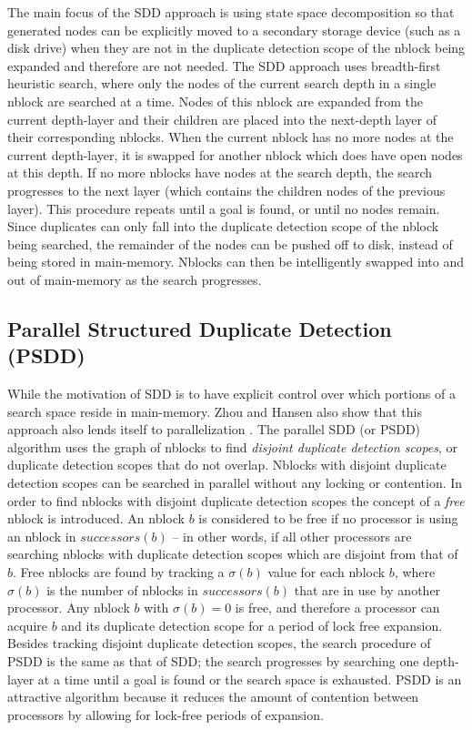 \documentclass{article} \usepackage{aaai} \usepackage{graphicx}
\begin{document}
The main focus of the SDD approach is using state space decomposition
so that generated nodes can be explicitly moved to a secondary storage
device (such as a disk drive) when they are not in the duplicate
detection scope of the nblock being expanded and therefore are not
needed.  The SDD approach uses breadth-first heuristic search, where
only the nodes of the current search depth in a single nblock are
searched at a time.  Nodes of this nblock are expanded from the
current depth-layer and their children are placed into the next-depth
layer of their corresponding nblocks.  When the current nblock has no
more nodes at the current depth-layer, it is swapped for another
nblock which does have open nodes at this depth.  If no more nblocks
have nodes at the search depth, the search progresses to the next
layer (which contains the children nodes of the previous layer).  This
procedure repeats until a goal is found, or until no nodes
remain. Since duplicates can only fall into the duplicate detection
scope of the nblock being searched, the remainder of the nodes can be
pushed off to disk, instead of being stored in main-memory.  Nblocks
can then be intelligently swapped into and out of main-memory as the
search progresses.

\subsection{Parallel Structured Duplicate Detection (PSDD)}

While the motivation of SDD is to have explicit control over which
portions of a search space reside in main-memory.  Zhou and Hansen
also show that this approach also lends itself to parallelization
\cite{zhou:psd}.  The parallel SDD (or PSDD) algorithm uses the graph
of nblocks to find \emph{disjoint duplicate detection scopes}, or
duplicate detection scopes that do not overlap.  Nblocks with disjoint
duplicate detection scopes can be searched in parallel without any
locking or contention.  In order to find nblocks with disjoint
duplicate detection scopes the concept of a \emph{free} nblock is
introduced.  An nblock $b$ is considered to be free if no processor is
using an nblock in $successors(b)$ -- in other words, if all other
processors are searching nblocks with duplicate detection scopes which
are disjoint from that of $b$.  Free nblocks are found by tracking a
$\sigma(b)$ value for each nblock $b$, where $\sigma(b)$ is the number
of nblocks in $successors(b)$ that are in use by another processor.
Any nblock $b$ with $\sigma(b) = 0$ is free, and therefore a processor
can acquire $b$ and its duplicate detection scope for a period of lock
free expansion.  Besides tracking disjoint duplicate detection scopes,
the search procedure of PSDD is the same as that of SDD; the search
progresses by searching one depth-layer at a time until a goal is
found or the search space is exhausted.  PSDD is an attractive
algorithm because it reduces the amount of contention between
processors by allowing for lock-free periods of expansion.
\end{document}
